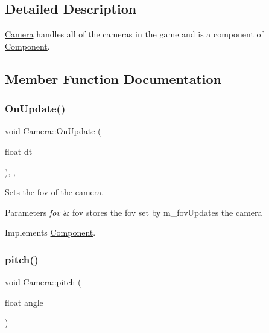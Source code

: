 \subsection{Detailed Description}
\mbox{\hyperlink{class_camera}{Camera}} handles all of the cameras in the game and is a component of \mbox{\hyperlink{class_component}{Component}}. 

\subsection{Member Function Documentation}
\mbox{\label{class_camera_a39a34df15a2791296a668537a242b9e5}} 
\subsubsection{\texorpdfstring{OnUpdate()}{OnUpdate()}}
{\footnotesize\ttfamily void Camera\+::\+On\+Update (\begin{DoxyParamCaption}\item[{float}]{dt }\end{DoxyParamCaption})\hspace{0.3cm}{\ttfamily [inline]}, {\ttfamily [override]}, {\ttfamily [virtual]}}



Sets the fov of the camera. 


\begin{DoxyParams}{Parameters}
{\em fov} & fov stores the fov set by m\+\_\+fov\+Updates the camera \\
\hline
\end{DoxyParams}


Implements \mbox{\hyperlink{class_component}{Component}}.

\mbox{\label{class_camera_a49e00b90b94853e4485a6bdf063796de}} 
\subsubsection{\texorpdfstring{pitch()}{pitch()}}
{\footnotesize\ttfamily void Camera\+::pitch (\begin{DoxyParamCaption}\item[{float}]{angle }\end{DoxyParamCaption})\hspace{0.3cm}{\ttfamily [inline]}}



